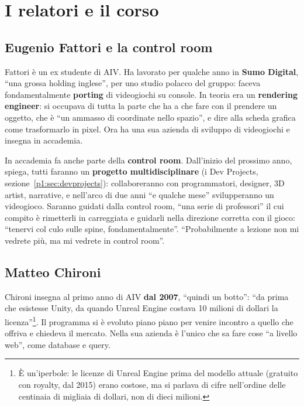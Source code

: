 \section{I relatori e il corso}
\label{p5:sec:corso}

\subsection{Eugenio Fattori e la control room}

Fattori è un ex studente di AIV. Ha lavorato per qualche anno in \textbf{Sumo
Digital}, ``una grossa holding inglese'', per uno studio polacco del gruppo:
faceva fondamentalmente \textbf{porting} di videogiochi su console. In teoria
era un \textbf{rendering engineer}: si occupava di tutta la parte che ha a che
fare con il prendere un oggetto, che è ``un ammasso di coordinate nello
spazio'', e dire alla scheda grafica come trasformarlo in pixel. Ora ha una
sua azienda di sviluppo di videogiochi e insegna in accademia.

In accademia fa anche parte della \textbf{control room}. Dall'inizio del
prossimo anno, spiega, tutti faranno un \textbf{progetto multidisciplinare}
(i Dev Projects, sezione~\ref{p1:sec:devprojects}): collaboreranno con
programmatori, designer, 3D artist, narrative, e nell'arco di due anni ``e
qualche mese'' svilupperanno un videogioco. Saranno guidati dalla control
room, ``una serie di professori'' il cui compito è rimetterli in carreggiata
e guidarli nella direzione corretta con il gioco: ``tenervi col culo sulle
spine, fondamentalmente''. ``Probabilmente a lezione non mi vedrete più, ma mi
vedrete in control room''.

\subsection{Matteo Chironi}

Chironi insegna al primo anno di AIV \textbf{dal 2007}, ``quindi un botto'':
``da prima che esistesse Unity, da quando Unreal Engine costava 10 milioni di
dollari la licenza''\footnote{È un'iperbole: le licenze di Unreal Engine prima
del modello attuale (gratuito con royalty, dal 2015) erano costose, ma si
parlava di cifre nell'ordine delle centinaia di migliaia di dollari, non di
dieci milioni.}. Il programma si è evoluto piano piano per venire incontro a
quello che offriva e chiedeva il mercato. Nella sua azienda è l'unico che sa
fare cose ``a livello web'', come database e query.

